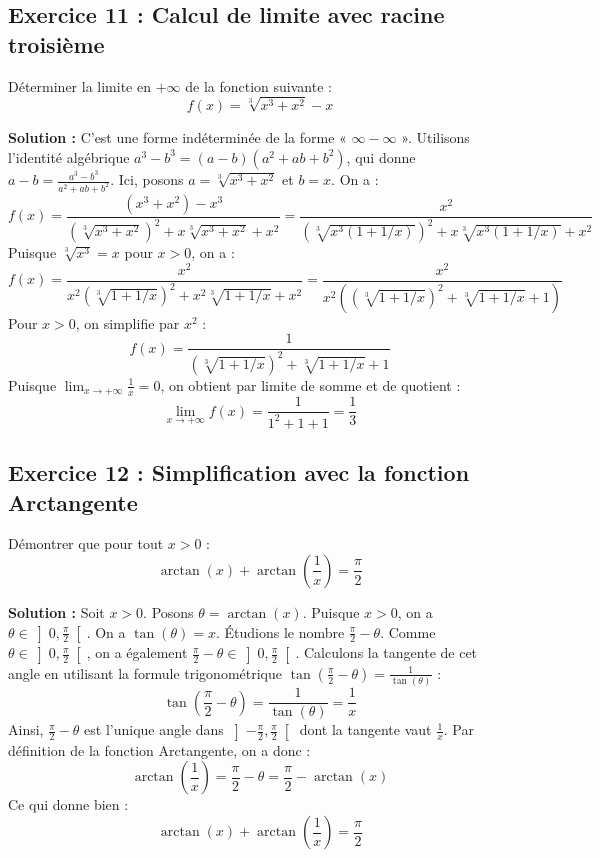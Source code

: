 \subsection*{Exercice 11 : Calcul de limite avec racine troisième}
Déterminer la limite en $+\infty$ de la fonction suivante :
\[
f(x) = \sqrt[3]{x^3 + x^2} - x
\]

\textbf{Solution :}
C'est une forme indéterminée de la forme « $\infty - \infty$ ». Utilisons l'identité algébrique $a^3 - b^3 = (a-b)(a^2 + ab + b^2)$, qui donne $a-b = \frac{a^3 - b^3}{a^2 + ab + b^2}$.
Ici, posons $a = \sqrt[3]{x^3+x^2}$ et $b = x$. On a :
\[
f(x) = \frac{(x^3 + x^2) - x^3}{(\sqrt[3]{x^3 + x^2})^2 + x\sqrt[3]{x^3 + x^2} + x^2} = \frac{x^2}{(\sqrt[3]{x^3(1 + 1/x)})^2 + x\sqrt[3]{x^3(1 + 1/x)} + x^2}
\]
Puisque $\sqrt[3]{x^3} = x$ pour $x > 0$, on a :
\[
f(x) = \frac{x^2}{x^2(\sqrt[3]{1 + 1/x})^2 + x^2\sqrt[3]{1 + 1/x} + x^2} = \frac{x^2}{x^2 \left( (\sqrt[3]{1 + 1/x})^2 + \sqrt[3]{1 + 1/x} + 1 \right)}
\]
Pour $x > 0$, on simplifie par $x^2$ :
\[
f(x) = \frac{1}{(\sqrt[3]{1 + 1/x})^2 + \sqrt[3]{1 + 1/x} + 1}
\]
Puisque $\lim_{x\to +\infty} \frac{1}{x} = 0$, on obtient par limite de somme et de quotient :
\[
\lim_{x \to +\infty} f(x) = \frac{1}{1^2 + 1 + 1} = \frac{1}{3}
\]

\subsection*{Exercice 12 : Simplification avec la fonction Arctangente}
Démontrer que pour tout $x > 0$ :
\[
\arctan(x) + \arctan\left(\frac{1}{x}\right) = \frac{\pi}{2}
\]

\textbf{Solution :}
Soit $x > 0$. Posons $\theta = \arctan(x)$.
Puisque $x > 0$, on a $\theta \in \left]0, \frac{\pi}{2}\right[$.
On a $\tan(\theta) = x$.
Étudions le nombre $\frac{\pi}{2} - \theta$. Comme $\theta \in \left]0, \frac{\pi}{2}\right[$, on a également $\frac{\pi}{2} - \theta \in \left]0, \frac{\pi}{2}\right[$.
Calculons la tangente de cet angle en utilisant la formule trigonométrique $\tan\left(\frac{\pi}{2} - \theta\right) = \frac{1}{\tan(\theta)}$ :
\[
\tan\left(\frac{\pi}{2} - \theta\right) = \frac{1}{\tan(\theta)} = \frac{1}{x}
\]
Ainsi, $\frac{\pi}{2} - \theta$ est l'unique angle dans $\left]-\frac{\pi}{2}, \frac{\pi}{2}\right[$ dont la tangente vaut $\frac{1}{x}$.
Par définition de la fonction Arctangente, on a donc :
\[
\arctan\left(\frac{1}{x}\right) = \frac{\pi}{2} - \theta = \frac{\pi}{2} - \arctan(x)
\]
Ce qui donne bien :
\[
\arctan(x) + \arctan\left(\frac{1}{x}\right) = \frac{\pi}{2}
\]

